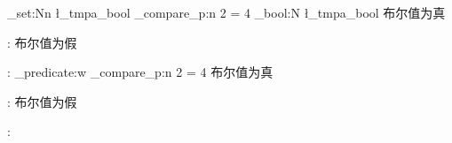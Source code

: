 \documentclass{article}
\begin{document}
\ExplSyntaxOn
\bool_set:Nn \l_tmpa_bool 
  { \int_compare_p:n { 2 = 4 } }
\if_bool:N \l_tmpa_bool
  布尔值为真 \par
\else:
  布尔值为假 \par
\fi:
\if_predicate:w 
  \int_compare_p:n { 2 = 4 }
  布尔值为真 \par
\else:
  布尔值为假 \par
\fi:
\ExplSyntaxOff
\end{document}
